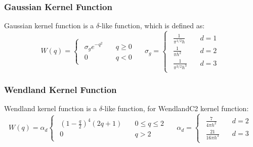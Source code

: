 \subsubsection{Gaussian Kernel Function}

Gaussian kernel function is a $\delta$-like function,
which is defined as:
\begin{equation}
    W(q)=
    \begin{cases}
        \begin{aligned}
            \sigma_g e^{-q^2}\quad &q \geq 0 \\
            0\quad &q < 0
        \end{aligned}
    \end{cases}\quad
    \sigma_g=
    \begin{cases}
        \begin{aligned}
            \frac{1}{\pi^{1/2}h} \quad &d=1 \\
            \frac{1}{\pi h^2} \quad &d=2 \\
            \frac{1}{\pi^{3/2} h^3} \quad &d=3
        \end{aligned}
    \end{cases}
\end{equation}

\subsubsection{Wendland Kernel Function}

Wendland kernel function is a $\delta$-like function, 
for WendlandC2 kernel function:
\begin{equation}
    W(q)=\alpha_d
    \begin{cases}
        \begin{aligned}
            \left(1-\frac{q}{2}\right)^4(2q+1)\quad &0\leq q \leq 2 \\
            0\quad &q > 2
        \end{aligned}
    \end{cases}\quad
    \alpha_d=
    \begin{cases}
        \begin{aligned}
            \frac{7}{4\pi h^2} \quad &d=2 \\
            \frac{21}{16\pi h^3} \quad &d=3
        \end{aligned}
    \end{cases}
\end{equation}

